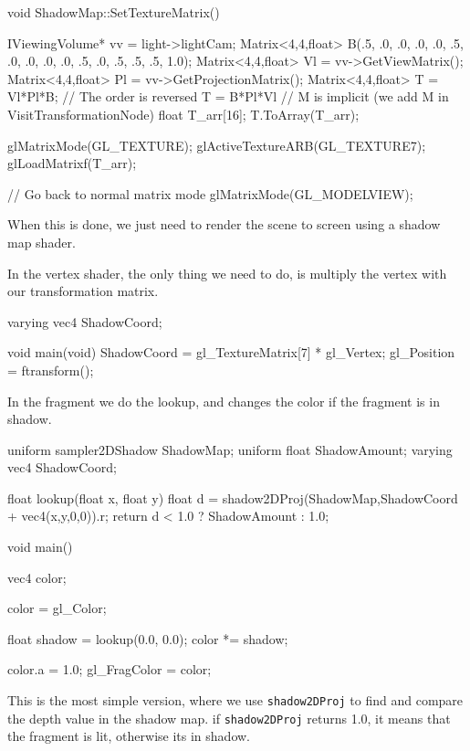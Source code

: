 \begin{cppcode}
  void ShadowMap::SetTextureMatrix() {    
    IViewingVolume* vv = light->lightCam;
    Matrix<4,4,float> B(.5, .0, .0,  .0,
                        .0, .5, .0,  .0,
                        .0, .0, .5,  .0,
                        .5, .5, .5, 1.0);
    Matrix<4,4,float> Vl = vv->GetViewMatrix();
    Matrix<4,4,float> Pl = vv->GetProjectionMatrix();    
    Matrix<4,4,float> T = Vl*Pl*B; // The order is reversed T = B*Pl*Vl 
                                   // M is implicit (we add M in VisitTransformationNode)
    float T_arr[16];
    T.ToArray(T_arr);

    glMatrixMode(GL_TEXTURE);
    glActiveTextureARB(GL_TEXTURE7);
    glLoadMatrixf(T_arr);

    // Go back to normal matrix mode
    glMatrixMode(GL_MODELVIEW);
}
\end{cppcode}

When this is done, we just need to render the scene to screen using a
shadow map shader.

In the vertex shader, the only thing we need to do, is multiply the
vertex with our transformation matrix.

\begin{cppcode}
varying vec4 ShadowCoord;

void main(void) {
    ShadowCoord = gl_TextureMatrix[7] * gl_Vertex;
    gl_Position = ftransform();
}
\end{cppcode}

In the fragment we do the lookup, and changes the color if the
fragment is in shadow.

\begin{cppcode}  
uniform sampler2DShadow ShadowMap;
uniform float ShadowAmount;
varying vec4 ShadowCoord;

float lookup(float x, float y) {
    float d = shadow2DProj(ShadowMap,ShadowCoord + vec4(x,y,0,0)).r;
    return d < 1.0 ? ShadowAmount : 1.0;
}

void main() {
    vec4 color;

    color = gl_Color;

    float shadow = lookup(0.0, 0.0);
    color *= shadow;

    color.a = 1.0;
    gl_FragColor = color;
}

\end{cppcode}

This is the most simple version, where we use \texttt{shadow2DProj} to
find and compare the depth value in the shadow map. if
\texttt{shadow2DProj} returns 1.0, it means that the fragment is lit,
otherwise its in shadow.

